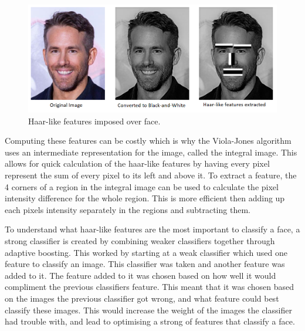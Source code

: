 \documentclass{l4proj}
\begin{document}
\begin{figure}[h!]
\centering
  \begin{minipage}{\textwidth}
    \includegraphics[width=\textwidth]{images/haarlike_features_face.png}
    \caption{Haar-like features imposed over face. }
    \label{haarlike_features_face}
  \end{minipage}  
\end{figure}

Computing these features can be costly which is why the Viola-Jones algorithm uses an intermediate representation for the image, called the integral image. This allows for quick calculation of the haar-like features by having every pixel represent the sum of every pixel to its left and above it. To extract a feature, the 4 corners of a region in the integral image can be used to calculate the pixel intensity difference for the whole region. This is more efficient then adding up each pixels intensity separately in the regions and subtracting them. 

To understand what haar-like features are the most important to classify a face, a strong classifier is created by combining weaker classifiers together through adaptive boosting. This worked by starting at a weak classifier which used one feature to classify an image. This classifier was taken and another feature was added to it. The feature added to it was chosen based on how well it would compliment the previous classifiers feature. This meant that it was chosen based on the images the previous classifier got wrong, and what feature could best classify these images. This would increase the weight of the images the classifier had trouble with, and lead to optimising a strong of features that classify a face.
\end{document}
